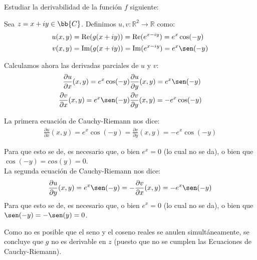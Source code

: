 \documentclass[12pt]{article}
\renewcommand{\Re}{\operatorname{Re}} %
\renewcommand{\Im}{\operatorname{Im}}
\begin{document}
    \begin{ejercicio}[2 puntos]
        Estudiar la derivabilidad de la función $f$ siguiente:


        Sea $z=x+iy\in \bb{C}$. Definimos $u,v:\mathbb{R}^2\to\mathbb{R}$ como:
        \begin{align*}
            u(x,y) &= \Re(g(x+iy)) = \Re(e^{x-iy}) = e^x\cos (-y)\\
            v(x,y) &= \Im(g(x+iy)) = \Im(e^{x-iy}) = e^x\sen (-y)
        \end{align*}

        Calculamos ahora las derivadas parciales de $u$ y $v$:
        \begin{align*}
            \frac{\partial u}{\partial x}(x,y) = e^x\cos (-y)&
            \frac{\partial u}{\partial y}(x,y) = e^x\sen (-y)\\
            \frac{\partial v}{\partial x}(x,y) = e^x\sen (-y)&
            \frac{\partial v}{\partial y}(x,y) = -e^x\cos (-y)
        \end{align*}

        La primera ecuación de Cauchy-Riemann nos dice:
        \begin{align*}
            \frac{\partial u}{\partial x}(x,y) = e^x\cos(-y)
            = \frac{\partial v}{\partial y}(x,y) = -e^x\cos(-y)
        \end{align*}

        Para que esto se de, es necesario que, o bien $e^x=0$ (lo cual no se da), o bien que $\cos(-y)=cos(y)=0$.\\

        La segunda ecuación de Cauchy-Riemann nos dice:
        \begin{align*}
            \frac{\partial u}{\partial y}(x,y) = e^x\sen(-y)
            = -\frac{\partial v}{\partial x}(x,y) = -e^x\sen(-y)
        \end{align*}
        Para que esto se de, es necesario que, o bien $e^x=0$ (lo cual no se da), o bien que $\sen(-y)=-\sen(y)=0$.

        Como no es posible que el seno y el coseno reales se anulen simultáneamente, se concluye que $g$ no es derivable en $z$ (puesto que no se cumplen las Ecuaciones de Cauchy-Riemann).
    \end{ejercicio}
\end{document}
